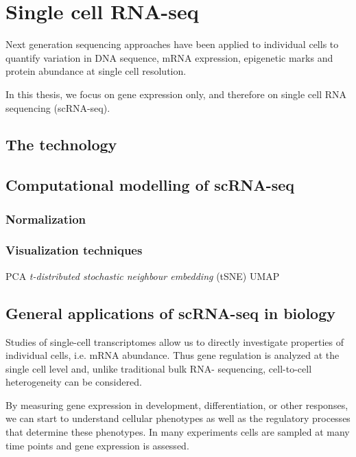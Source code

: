 \section{Single cell RNA-seq}  %

Next generation sequencing approaches have been applied to individual cells to quantify
variation in DNA sequence, mRNA expression, epigenetic marks and protein abundance
at single cell resolution.

In this thesis, we focus on gene expression only, and therefore on single cell RNA sequencing (scRNA-seq).\\

\subsection{The technology}

\subsection{Computational modelling of scRNA-seq}
\subsubsection{Normalization}
\subsubsection{Visualization techniques}

PCA
\textit{t-distributed stochastic neighbour embedding} (tSNE)
UMAP

\subsection{General applications of scRNA-seq in biology}

Studies of single-cell transcriptomes allow us to directly investigate properties of individual cells, i.e. mRNA abundance. 
Thus gene regulation is analyzed at the single cell level and, unlike traditional bulk RNA- sequencing, cell-to-cell heterogeneity can be considered.

By measuring gene expression in development, differentiation, or other responses, we can start to understand cellular phenotypes as well as the regulatory processes that determine these phenotypes. 
In many experiments cells are sampled at many time points and gene expression is assessed.

